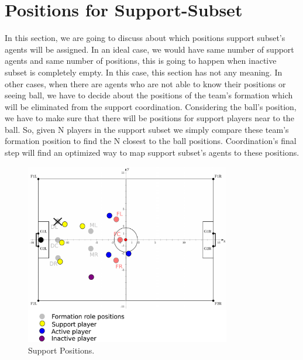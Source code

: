 \section{Positions for Support-Subset}
In this section, we are going to discuss about which positions support subset's agents will be assigned. In an ideal case, we would have same number of support agents and same number of positions, this is going to happen when inactive subset is completely empty. In this case, this section has not any meaning. In other cases, when there are agents who are not able to know their positions or seeing ball, we have to decide about the positions of the team's formation which will be eliminated from the support coordination. Considering the ball's position, we have to make sure that there will be positions for support players near to the ball. So, given N players in the support subset we simply compare these team's formation position to find the N closest to the ball positions. Coordination's final step will find an optimized way to map support subset's agents to these positions.

\begin{figure}[t!]
\centering
  \includegraphics[width=0.8\textwidth]{Chapter4/figures/SupportPos.pdf}
  \caption{Support Positions.} 
  \label{fig:SupportPos}
\end{figure}

